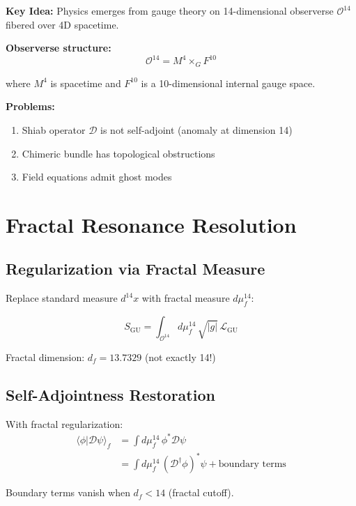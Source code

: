 \textbf{Key Idea:} Physics emerges from gauge theory on 14-dimensional observerse $\mathcal{O}^{14}$ fibered over 4D spacetime.

\textbf{Observerse structure:}
\begin{equation}
\mathcal{O}^{14} = M^4 \times_G F^{10}
\end{equation}

where $M^4$ is spacetime and $F^{10}$ is a 10-dimensional internal gauge space.

\textbf{Problems:}
\begin{enumerate}
\item Shiab operator $\mathcal{D}$ is not self-adjoint (anomaly at dimension 14)
\item Chimeric bundle has topological obstructions
\item Field equations admit ghost modes
\end{enumerate}

\section{Fractal Resonance Resolution}

\subsection{Regularization via Fractal Measure}

Replace standard measure $d^{14}x$ with fractal measure $d\mu_f^{14}$:

\begin{equation}
S_{\text{GU}} = \int_{\mathcal{O}^{14}} d\mu_f^{14} \, \sqrt{|g|} \, \mathcal{L}_{\text{GU}}
\end{equation}

Fractal dimension: $d_f = 13.7329$ (not exactly 14!)

\subsection{Self-Adjointness Restoration}

With fractal regularization:
\begin{align}
\langle \phi | \mathcal{D} \psi \rangle_f &= \int d\mu_f^{14} \, \phi^* \mathcal{D} \psi \\
&= \int d\mu_f^{14} \, (\mathcal{D}^\dagger \phi)^* \psi + \text{boundary terms}
\end{align}

Boundary terms vanish when $d_f < 14$ (fractal cutoff).


